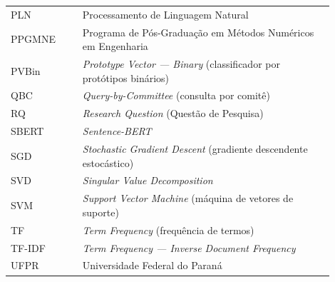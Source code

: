 \begin{listaacron}
\begin{longtable}[l]{p{0.2\linewidth}p{0.7\linewidth}}
PLN & Processamento de Linguagem Natural\\
PPGMNE & Programa de Pós-Graduação em Métodos Numéricos em Engenharia\\
PVBin & \textit{Prototype Vector — Binary} (classificador por protótipos binários)\\
QBC & \textit{Query-by-Committee} (consulta por comitê)\\
RQ & \textit{Research Question} (Questão de Pesquisa)\\
SBERT & \textit{Sentence-BERT}\\
SGD & \textit{Stochastic Gradient Descent} (gradiente descendente estocástico)\\
SVD & \textit{Singular Value Decomposition}\\
SVM & \textit{Support Vector Machine} (máquina de vetores de suporte)\\
TF & \textit{Term Frequency} (frequência de termos)\\
TF-IDF & \textit{Term Frequency — Inverse Document Frequency}\\
UFPR & Universidade Federal do Paraná\\
\end{longtable}

\end{listaacron}

